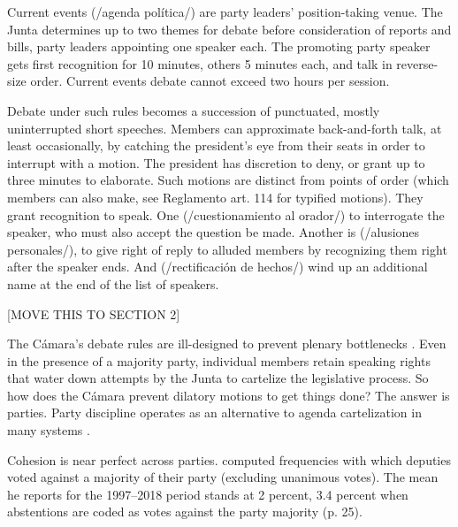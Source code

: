 \documentclass[letter,12pt]{article}
\begin{document}
Current events (/agenda política/) are party leaders' position-taking venue. The Junta determines up to two themes for debate before consideration of reports and bills, party leaders appointing one speaker each. The promoting party speaker gets first recognition for 10 minutes, others 5 minutes each, and talk in reverse-size order. Current events debate cannot exceed two hours per session. 

Debate under such rules becomes a succession of punctuated, mostly uninterrupted short speeches. Members can approximate back-and-forth talk, at least occasionally, by catching the president's eye from their seats in order to interrupt with a motion. The president has discretion to deny, or grant up to three minutes to elaborate. Such motions are distinct from points of order (which members can also make, see Reglamento art. 114 for typified motions). They grant recognition to speak. One (/cuestionamiento al orador/) to interrogate the speaker, who must also accept the question be made. Another is (/alusiones personales/), to give right of reply to alluded members by recognizing them right after the speaker ends. And (/rectificación de hechos/) wind up an additional name at the end of the list of speakers. 


[MOVE THIS TO SECTION 2]

The Cámara's debate rules are ill-designed to prevent plenary bottlenecks \citep{cox.2006}. Even in the presence of a majority party, individual members retain speaking rights that water down attempts by the Junta to cartelize the legislative process. So how does the Cámara prevent dilatory motions to get things done? The answer is parties. Party discipline operates as an alternative to agenda cartelization in many systems \citep{prata.2006}. 

Cohesion is near perfect across parties. \citet{tellez-del-rio.2018} computed frequencies with which deputies voted against a majority of their party (excluding unanimous votes). The mean he reports for the 1997--2018 period stands at 2 percent, 3.4 percent when abstentions are coded as votes against the party majority (p. 25). 
\end{document}
